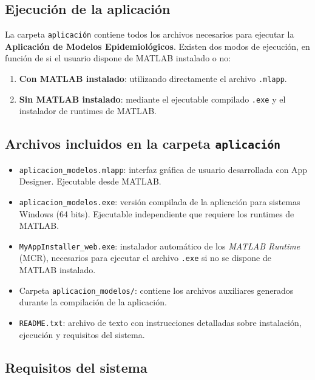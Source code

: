\subsection*{Ejecución de la aplicación}

La carpeta \texttt{aplicación} contiene todos los archivos necesarios para ejecutar la \textbf{Aplicación de Modelos Epidemiológicos}. Existen dos modos de ejecución, en función de si el usuario dispone de MATLAB instalado o no:

\begin{enumerate}
    \item \textbf{Con MATLAB instalado}: utilizando directamente el archivo \texttt{.mlapp}.
    \item \textbf{Sin MATLAB instalado}: mediante el ejecutable compilado \texttt{.exe} y el instalador de runtimes de MATLAB.
\end{enumerate}

\subsection*{Archivos incluidos en la carpeta \texttt{aplicación}}

\begin{itemize}
    \item \texttt{aplicacion\_modelos.mlapp}: interfaz gráfica de usuario desarrollada con App Designer. Ejecutable desde MATLAB.
    
    \item \texttt{aplicacion\_modelos.exe}: versión compilada de la aplicación para sistemas Windows (64 bits). Ejecutable independiente que requiere los runtimes de MATLAB.

    \item \texttt{MyAppInstaller\_web.exe}: instalador automático de los \textit{MATLAB Runtime} (MCR), necesarios para ejecutar el archivo \texttt{.exe} si no se dispone de MATLAB instalado.

    \item Carpeta \texttt{aplicacion\_modelos/}: contiene los archivos auxiliares generados durante la compilación de la aplicación.

    \item \texttt{README.txt}: archivo de texto con instrucciones detalladas sobre instalación, ejecución y requisitos del sistema.
\end{itemize}

\subsection*{Requisitos del sistema}

